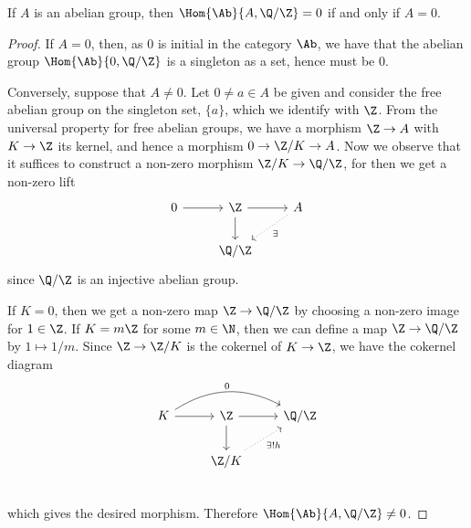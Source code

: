 \documentclass[10pt]{amsart}
\begin{document}
\begin{lem}\label{lem12}
  If $A$ is an abelian group, then $\Hom{\Ab}{A,\Q/\Z} = 0$ if and only if $A = 0$.
  
  \begin{proof}
    If $A = 0$, then, as $0$ is initial in the category $\Ab$, we have that the abelian group $\Hom{\Ab}{0, \Q/\Z}$ is a singleton as a set, hence must be $0$.

    Conversely, suppose that $A \neq 0$.
    Let $0 \neq a \in A$ be given and consider the free abelian group on the singleton set, $\{a\}$, which we identify with $\Z$.
    From the universal property for free abelian groups, we have a morphism $\Z \rightarrow A$ with $K \rightarrow \Z$ its kernel, and hence a morphism $0 \rightarrow \Z/K \rightarrow A$.
    Now we observe that it suffices to construct a non-zero morphism $\Z/K \rightarrow \Q/\Z$, for then we get a non-zero lift
    $$\begin{tikzcd}
      0 \arrow{r} & \Z \arrow{d} \arrow{r} & A \arrow[dotted]{ld}{\exists}\\
      & \Q/\Z &
    \end{tikzcd}$$
    since $\Q/\Z$ is an injective abelian group.
    
    If $K = 0$, then we get a non-zero map $\Z \rightarrow \Q/\Z$ by choosing a non-zero image for $1 \in \Z$.
    If $K = m\Z$ for some $m \in \N$, then we can define a map $\Z \rightarrow \Q/\Z$ by $1 \mapsto 1/m$. 
    Since $\Z \rightarrow \Z/K$ is the cokernel of $K \rightarrow \Z$, we have the cokernel diagram
    $$\begin{tikzcd}
      K\arrow[bend left]{rr}{0} \arrow{r} & \Z\arrow{d} \arrow{r} & \Q/\Z \\
      & \Z/K \arrow[dotted, swap]{ur}{\exists !h}&\\
    \end{tikzcd}$$
    which gives the desired morphism.
    Therefore $\Hom{\Ab}{A, \Q/\Z} \neq 0$.
  \end{proof}
\end{lem}
\end{document}
